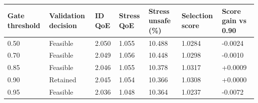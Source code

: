 \begin{tabular}{lllllll}
\toprule
Gate threshold & Validation decision & ID QoE & Stress QoE & Stress unsafe (\%) & Selection score & Score gain vs 0.90 \\
\midrule
0.50 & Feasible & 2.050 & 1.055 & 10.488 & 1.0284 & -0.0024 \\
0.70 & Feasible & 2.049 & 1.056 & 10.448 & 1.0298 & -0.0010 \\
0.85 & Feasible & 2.046 & 1.055 & 10.378 & 1.0317 & +0.0009 \\
0.90 & Retained & 2.045 & 1.054 & 10.366 & 1.0308 & +0.0000 \\
0.95 & Feasible & 2.036 & 1.048 & 10.364 & 1.0237 & -0.0072 \\
\bottomrule
\end{tabular}
